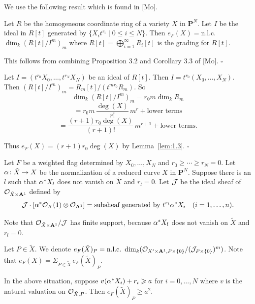 \documentclass[12pt]{memoir}
\begin{document}
\begin{ptcbp}
We use the following result which is found in [Mo].


\begin{Lem}\label{lem:1.3}
Let $R$ be the homogeneous coordinate ring of a variety $X$ in $\mathbf{P}^N$. Let $I$ be the ideal in $R[t]$ generated by $\{X_i t^{r_i} \mid 0 \leqslant i \leqslant N\}$. Then $e_F(X) = \text{n.l.c.}$ $\dim_k(R[t]/I^m)_m$ where $R[t] = \bigoplus_{i=1}^{\infty} R_i[t]$ is the grading for $R[t]$.
\end{Lem}

\begin{ptcbp}
This follows from combining Proposition 3.2 and Corollary 3.3 of [Mo]. \hfill$\square$
\end{ptcbp}

Let $I = (t^{r_0} X_0, \dots, t^{r_N} X_N)$ be an ideal of $R[t]$. Then $I = t^{r_0}(X_0, \dots, X_N)$. Then $(R[t]/I^m)_m = R_m[t]/(t^{mr_0} R_m)$. So
\[
\dim_k(R[t]/I^m)_m = r_0 m \dim_k R_m
\]
\[
= r_0 m\,\frac{\deg(X)}{r!}\, m^r + \text{lower terms}
\]
\[
= \frac{(r+1)r_0 \deg(X)}{(r+1)!}\, m^{r+1} + \text{lower terms.}
\]

Thus $e_F(X) = (r+1)r_0 \deg(X)$ by Lemma~\ref{lem:1.3}. \hfill$\square$
\end{ptcbp}

Let $F$ be a weighted flag determined by $X_0, \dots, X_N$ and $r_0 \geqslant \cdots \geqslant r_N = 0$. Let $\alpha\colon \tilde{X} \to X$ be the normalization of a reduced curve $X$ in $\mathbf{P}^N$. Suppose there is an $l$ such that $\alpha^* X_l$ does not vanish on $\tilde{X}$ and $r_l = 0$. Let $\mathcal{J}$ be the ideal sheaf of $\mathcal{O}_{\tilde{X} \times \mathbf{A}^1}$ defined by
\[
\mathcal{J} \cdot [\alpha^* \mathcal{O}_X(1) \otimes \mathcal{O}_{\mathbf{A}^1}] = \text{subsheaf generated by } t^{r_i} \alpha^* X_i \quad (i = 1, \dots, n).
\]

Note that $\mathcal{O}_{\tilde{X} \times \mathbf{A}^1}/\mathcal{J}$ has finite support, because $\alpha^* X_l$ does not vanish on $\tilde{X}$ and $r_l = 0$.

Let $P \in \tilde{X}$. We denote $e_F(\tilde{X})_P = \text{n.l.c.}\ \dim_k(\cO_{X' \times \mathbf{A}^1, P \times \{0\}}/(\cJ_{P \times \{0\}})^m)$. Note that $e_F(X) = \Sigma_{P \in \tilde{X}}\, e_F(\tilde{X})_P$.

\begin{Lem}\label{lem:1.4}
In the above situation, suppose $v(\alpha^* X_i) + r_i \geqslant a$ for $i = 0, \dots, N$ where $v$ is the natural valuation on $\mathcal{O}_{\tilde{X},P}$. Then $e_F(\tilde{X})_P \geqslant a^2$.
\end{Lem}
\end{document}

